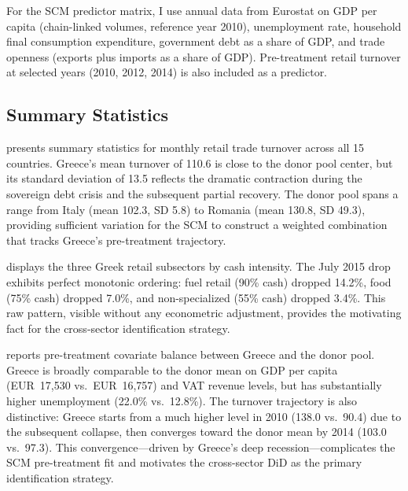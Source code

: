 \documentclass[12pt]{article}
\begin{document}
For the SCM predictor matrix, I use annual data from Eurostat on GDP per capita (chain-linked volumes, reference year 2010), unemployment rate, household final consumption expenditure, government debt as a share of GDP, and trade openness (exports plus imports as a share of GDP). Pre-treatment retail turnover at selected years (2010, 2012, 2014) is also included as a predictor.

\subsection{Summary Statistics}

 presents summary statistics for monthly retail trade turnover across all 15 countries. Greece's mean turnover of 110.6 is close to the donor pool center, but its standard deviation of 13.5 reflects the dramatic contraction during the sovereign debt crisis and the subsequent partial recovery. The donor pool spans a range from Italy (mean 102.3, SD 5.8) to Romania (mean 130.8, SD 49.3), providing sufficient variation for the SCM to construct a weighted combination that tracks Greece's pre-treatment trajectory.



 displays the three Greek retail subsectors by cash intensity. The July 2015 drop exhibits perfect monotonic ordering: fuel retail (90\% cash) dropped 14.2\%, food (75\% cash) dropped 7.0\%, and non-specialized (55\% cash) dropped 3.4\%. This raw pattern, visible without any econometric adjustment, provides the motivating fact for the cross-sector identification strategy.



 reports pre-treatment covariate balance between Greece and the donor pool. Greece is broadly comparable to the donor mean on GDP per capita (EUR~17,530 vs.\ EUR~16,757) and VAT revenue levels, but has substantially higher unemployment (22.0\% vs.\ 12.8\%). The turnover trajectory is also distinctive: Greece starts from a much higher level in 2010 (138.0 vs.\ 90.4) due to the subsequent collapse, then converges toward the donor mean by 2014 (103.0 vs.\ 97.3). This convergence---driven by Greece's deep recession---complicates the SCM pre-treatment fit and motivates the cross-sector DiD as the primary identification strategy.




\end{document}
